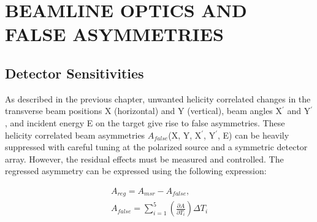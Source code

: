 \chapter{BEAMLINE OPTICS AND FALSE ASYMMETRIES}
\label{BEAMLINE OPTICS AND FALSE ASYMMETRIES}

\section{Detector Sensitivities}
\label{Detector Sensitivities}

As described in the previous chapter, unwanted helicity correlated changes in the transverse beam positions X (horizontal) and Y (vertical), beam angles X$^{\prime}$ and Y$^{\prime}$, and incident energy E on the target give rise to false asymmetries. These helicity correlated beam asymmetries $A_{false}$(X, Y, X$^{\prime}$, Y$^{\prime}$, E) can be heavily suppressed with careful tuning at the polarized source and a symmetric detector array. However, the residual effects must be measured and controlled. The regressed asymmetry can be expressed using the following expression: %

\begin{equation} \label{equ:bm1}
\begin{split}
A_{reg} = A_{msr} - A_{false}, \\
A_{false} = \sum^{5}_{i=1} \left(\frac{\partial A }{ \partial T_{i} }\right) \Delta T_{i}
\end{split}
\end{equation}


